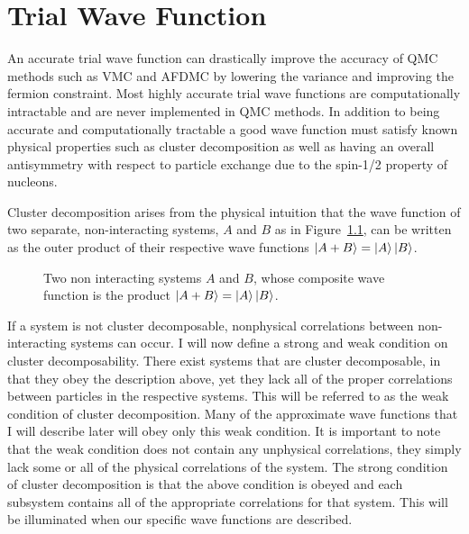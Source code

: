 \chapter{Trial Wave Function}
\label{ch:trial}
An accurate trial wave function can drastically improve the accuracy of QMC methods such as VMC and AFDMC by lowering the variance and improving the fermion constraint. Most highly accurate trial wave functions are computationally intractable and are never implemented in QMC methods. In addition to being accurate and computationally tractable a good wave function must satisfy known physical properties such as cluster decomposition as well as having an overall antisymmetry with respect to particle exchange due to the spin-1/2 property of nucleons.

Cluster decomposition arises from the physical intuition that the wave function of two separate, non-interacting systems, $A$ and $B$ as in Figure~\ref{fig:cluster}, can be written as the outer product of their respective wave functions $\left| A+B \right>=\left| A \right>\left| B \right>$.
\begin{figure}[h]
   \centering
   \caption{Two non interacting systems $A$ and $B$, whose composite wave function is the product $\left| A+B \right>=\left| A \right>\left| B \right>$.}
   \label{fig:cluster}
\end{figure}
If a system is not cluster decomposable, nonphysical correlations between non-interacting systems can occur. I will now define a strong and weak condition on cluster decomposability. There exist systems that are cluster decomposable, in that they obey the description above, yet they lack all of the proper correlations between particles in the respective systems. This will be referred to as the weak condition of cluster decomposition. Many of the approximate wave functions that I will describe later will obey only this weak condition. It is important to note that the weak condition does not contain any unphysical correlations, they simply lack some or all of the physical correlations of the system. The strong condition of cluster decomposition is that the above condition is obeyed and each subsystem contains all of the appropriate correlations for that system. This will be illuminated when our specific wave functions are described.

